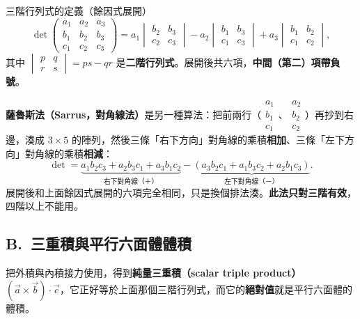 \documentclass[11pt]{article}
\begin{document}
\begin{補充框}{三階行列式的定義（餘因式展開）}
$$\det\begin{pmatrix}a_1&a_2&a_3\\ b_1&b_2&b_3\\ c_1&c_2&c_3\end{pmatrix}
=a_1\begin{vmatrix}b_2&b_3\\ c_2&c_3\end{vmatrix}
-a_2\begin{vmatrix}b_1&b_3\\ c_1&c_3\end{vmatrix}
+a_3\begin{vmatrix}b_1&b_2\\ c_1&c_2\end{vmatrix},$$
其中 $\begin{vmatrix}p&q\\ r&s\end{vmatrix}=ps-qr$ 是\textbf{二階行列式}。展開後共六項，\textbf{中間（第二）項帶負號}。

\textbf{薩魯斯法（Sarrus，對角線法）}是另一種算法：把前兩行（$\begin{smallmatrix}a_1\\b_1\\c_1\end{smallmatrix}$、$\begin{smallmatrix}a_2\\b_2\\c_2\end{smallmatrix}$）再抄到右邊，湊成 $3\times5$ 的陣列，然後三條「右下方向」對角線的乘積\textbf{相加}、三條「左下方向」對角線的乘積\textbf{相減}：
$$\det=\underbrace{a_1b_2c_3+a_2b_3c_1+a_3b_1c_2}_{\text{右下對角線（＋）}}-\underbrace{(a_3b_2c_1+a_1b_3c_2+a_2b_1c_3)}_{\text{左下對角線（－）}}.$$
展開後和上面餘因式展開的六項完全相同，只是換個排法湊。\textbf{此法只對三階有效}，四階以上不能用。
\end{補充框}


\subsection*{\sffamily B.\ 三重積與平行六面體體積}

把外積與內積接力使用，得到\textbf{純量三重積（scalar triple product）} $(\vec a\times\vec b)\cdot\vec c$，它正好等於上面那個三階行列式，而它的\textbf{絕對值}就是平行六面體的體積。
\end{document}
